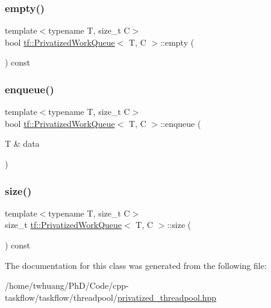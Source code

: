 \subsubsection{\texorpdfstring{empty()}{empty()}}
{\footnotesize\ttfamily template$<$typename T, size\+\_\+t C$>$ \\
bool \hyperlink{classtf_1_1PrivatizedWorkQueue}{tf\+::\+Privatized\+Work\+Queue}$<$ T, C $>$\+::empty (\begin{DoxyParamCaption}{ }\end{DoxyParamCaption}) const\hspace{0.3cm}{\ttfamily [inline]}}

\mbox{\label{classtf_1_1PrivatizedWorkQueue_aa0fc3d2e7d6747651140f61ebd4c079c}} 
\subsubsection{\texorpdfstring{enqueue()}{enqueue()}}
{\footnotesize\ttfamily template$<$typename T, size\+\_\+t C$>$ \\
bool \hyperlink{classtf_1_1PrivatizedWorkQueue}{tf\+::\+Privatized\+Work\+Queue}$<$ T, C $>$\+::enqueue (\begin{DoxyParamCaption}\item[{T \&}]{data }\end{DoxyParamCaption})\hspace{0.3cm}{\ttfamily [inline]}}

\mbox{\label{classtf_1_1PrivatizedWorkQueue_a2c4214bb253a5fdae5f1a727d1cd5156}} 
\subsubsection{\texorpdfstring{size()}{size()}}
{\footnotesize\ttfamily template$<$typename T, size\+\_\+t C$>$ \\
size\+\_\+t \hyperlink{classtf_1_1PrivatizedWorkQueue}{tf\+::\+Privatized\+Work\+Queue}$<$ T, C $>$\+::size (\begin{DoxyParamCaption}{ }\end{DoxyParamCaption}) const\hspace{0.3cm}{\ttfamily [inline]}}



The documentation for this class was generated from the following file\+:\begin{DoxyCompactItemize}
\item 
/home/twhuang/\+Ph\+D/\+Code/cpp-\/taskflow/taskflow/threadpool/\hyperlink{privatized__threadpool_8hpp}{privatized\+\_\+threadpool.\+hpp}\end{DoxyCompactItemize}
